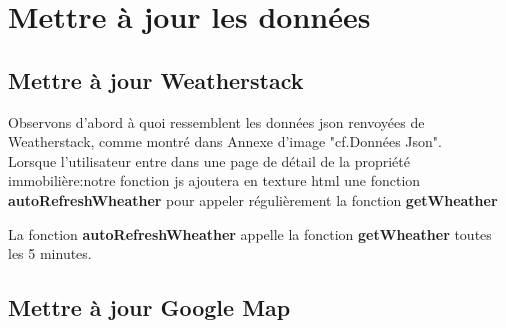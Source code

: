 \documentclass[14px]{article}
\begin{document}
\section{Mettre à jour les données}
\subsection{Mettre à jour Weatherstack}
Observons d'abord à quoi ressemblent les données json renvoyées de Weatherstack, comme montré dans Annexe d'image "cf.Données Json".\\
Lorsque l'utilisateur entre dans une page de détail de la propriété immobilière:notre fonction js ajoutera en texture html une fonction \textbf{autoRefreshWheather} pour appeler régulièrement la fonction \textbf{getWheather}\\

\begin{figure1}
\end{figure1}

La fonction \textbf{autoRefreshWheather} appelle la fonction \textbf{getWheather} toutes les 5 minutes.

\begin{figure2}
\end{figure2}

\subsection{Mettre à jour Google Map}
\end{document}
